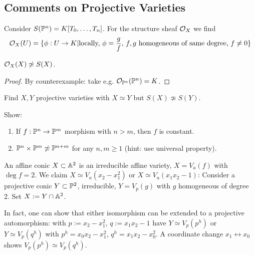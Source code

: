 \documentclass[a4paper,11pt]{article}
\begin{document}
			{\color{gray}\subsection*{Comments on Projective Varieties}
			
				\begin{eg}
					Consider $S(\P^n)=K[T_0,\dots,T_n]$. For the structure sheaf $\O_X$ we find
					\begin{equation*}
						\O_X(U)=\{\phi:U\rightarrow K|\text{locally, }\phi=\frac{g}{f},\,f,g\text{ homogeneous of same degree, }f\neq0\}
					\end{equation*}
				\end{eg}

				\begin{prop}
					$\O_X(X)\not\simeq S(X)$.
				\end{prop}
				\begin{proof}
					By counterexample: take e.g. $\O_{\P^n}(\P^n)=K$.
				\end{proof}

				\begin{exc}
					Find $X,Y$ projective varieties with $X\simeq Y$ but $S(X)\not\simeq S(Y)$.
				\end{exc}

				\begin{exc}
					Show:
					\begin{enumerate}
						\item If $f:\P^n\rightarrow\P^m$ morphism with $n>m$, then $f$ is constant.
						\item $\P^n\times\P^m\not\simeq\P^{n+m}$ for any $n,m\ge1$ (hint: use universal property). 
					\end{enumerate}
				\end{exc}

				\begin{eg}
					An affine conic $X\subset\AA^2$ is an irreducible affine variety, $X=V_a(f)$ with $\deg f=2$. We claim $X\simeq V_a(x_2-x_1^2)$ or $X\simeq V_a(x_1x_2-1)$: Consider a projective conic $Y\subset\P^2$, irreducible, $Y=V_p(g)$ with $g$ homogeneous of degree 2. Set $X:=Y\cap\AA^2$.

					In fact, one can show that either isomorphism can be extended to a projective automorphism: with $p:=x_2-x_1^2$, $q:=x_1x_2-1$ have $Y\simeq V_p(p^h)$ or $Y\simeq V_p(q^h)$ with $p^h=x_0x_2-x_1^2$, $q^h=x_1x_2-x_0^2$. A coordinate change $x_1\leftrightarrow x_0$ shows $V_p(p^h)\simeq V_p(q^h)$.
				\end{eg}

}
\end{document}
